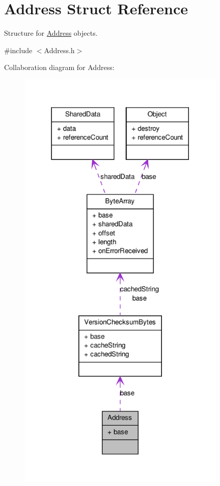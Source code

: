 \hypertarget{struct_address}{
\section{Address Struct Reference}
\label{struct_address}
}


Structure for \hyperlink{struct_address}{Address} objects.  




{\ttfamily \#include $<$Address.h$>$}



Collaboration diagram for Address:\nopagebreak
\begin{figure}[H]
\begin{center}
\leavevmode
\includegraphics[width=282pt]{struct_address__coll__graph}
\end{center}
\end{figure}
